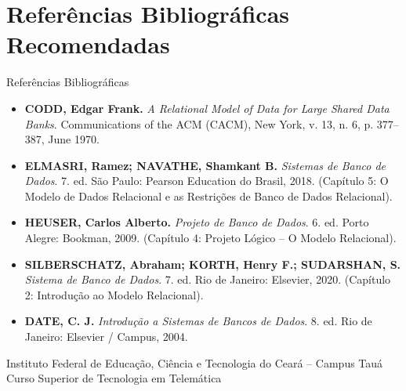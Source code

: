 \section[Referências]{Referências Bibliográficas Recomendadas}

\begin{frame}{Referências Bibliográficas}
  \begin{itemize}
    \scriptsize
    \item \textbf{CODD, Edgar Frank.} \textit{A Relational Model of Data for Large Shared Data Banks}. Communications of the ACM (CACM), New York, v. 13, n. 6, p. 377--387, June 1970.
    \item \textbf{ELMASRI, Ramez; NAVATHE, Shamkant B.} \textit{Sistemas de Banco de Dados}. 7. ed. São Paulo: Pearson Education do Brasil, 2018. (Capítulo 5: O Modelo de Dados Relacional e as Restrições de Banco de Dados Relacional).
    \item \textbf{HEUSER, Carlos Alberto.} \textit{Projeto de Banco de Dados}. 6. ed. Porto Alegre: Bookman, 2009. (Capítulo 4: Projeto Lógico -- O Modelo Relacional).
    \item \textbf{SILBERSCHATZ, Abraham; KORTH, Henry F.; SUDARSHAN, S.} \textit{Sistema de Banco de Dados}. 7. ed. Rio de Janeiro: Elsevier, 2020. (Capítulo 2: Introdução ao Modelo Relacional).
    \item \textbf{DATE, C. J.} \textit{Introdução a Sistemas de Bancos de Dados}. 8. ed. Rio de Janeiro: Elsevier / Campus, 2004.
  \end{itemize}
  \vspace{0.15cm}
  \begin{center}
    \tiny\color{gray}
    Instituto Federal de Educação, Ciência e Tecnologia do Ceará -- Campus Tauá\\
    Curso Superior de Tecnologia em Telemática
  \end{center}
\end{frame}

